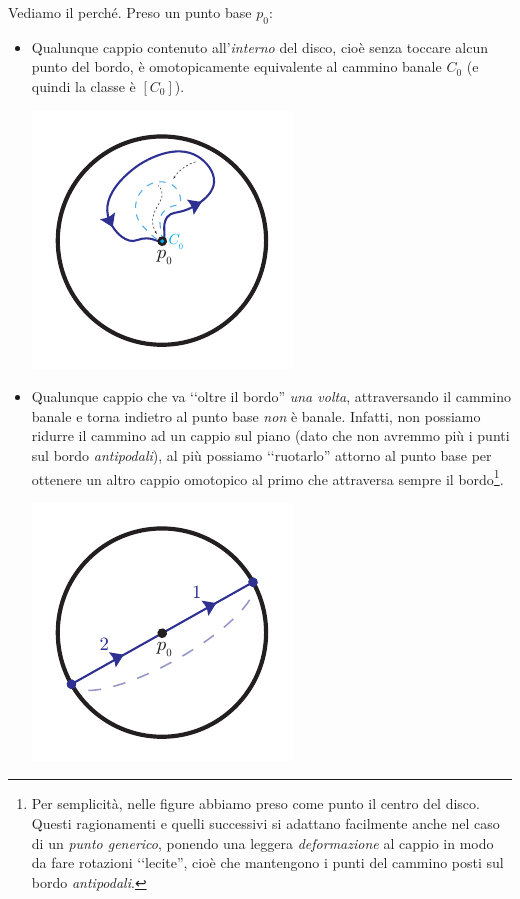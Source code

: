 \begin{itemize}
\begin{equation}
		\end{equation}
	Vediamo il perché. Preso un punto base $p_0$:
		\begin{itemize}
				\item Qualunque cappio contenuto all'\textit{interno} del disco, cioè senza toccare alcun punto del bordo, è omotopicamente equivalente al cammino banale $C_0$ (e quindi la classe è $\left[C_0\right]$).
			\begin{center}
				\includegraphics[trim=0cm 0cm 0cm 0cm,clip,scale=0.95]{images/projdiscindisc.pdf}
			\end{center}
			\item Qualunque cappio che va ‘‘oltre il bordo'' \textit{una volta}, attraversando il cammino banale e torna indietro al punto base \textit{non} è banale. Infatti, non possiamo ridurre il cammino ad un cappio sul piano (dato che non avremmo più i punti sul bordo \textit{antipodali}), al più possiamo ‘‘ruotarlo'' attorno al punto base per ottenere un altro cappio omotopico al primo che attraversa sempre il bordo\footnote{Per semplicità, nelle figure abbiamo preso come punto il centro del disco. Questi ragionamenti e quelli successivi si adattano facilmente anche nel caso di un \textit{punto generico}, ponendo una leggera \textit{deformazione} al cappio in modo da fare rotazioni ‘‘lecite'', cioè che mantengono i punti del cammino posti sul bordo \textit{antipodali}.}.
						\begin{center}
				\includegraphics[trim=0cm 0cm 0cm 0cm,clip,scale=0.95]{images/projdiscoverborder1.pdf}

\end{center}
\end{itemize}
\end{itemize}
